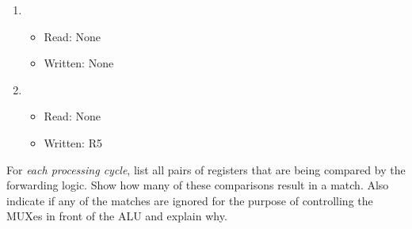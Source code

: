 \documentclass[12pt,letterpaper]{hmcpset}
\begin{document}
\begin{solution}
\begin{enumerate}[label=Cycle \arabic*]
\item
\begin{itemize}
\item Read: None
\item Written: None
\end{itemize}

\item
\begin{itemize}
\item Read: None
\item Written: R5
\end{itemize}

\end{enumerate}
\end{solution}

\begin{problem}[2e]
For \emph{each processing cycle}, list all pairs of registers that are being compared by the forwarding logic. Show how many of these comparisons result in a match. Also indicate if any of the matches are ignored for the purpose of controlling the MUXes in front of the ALU and explain why.  
\end{problem}
\end{document}
